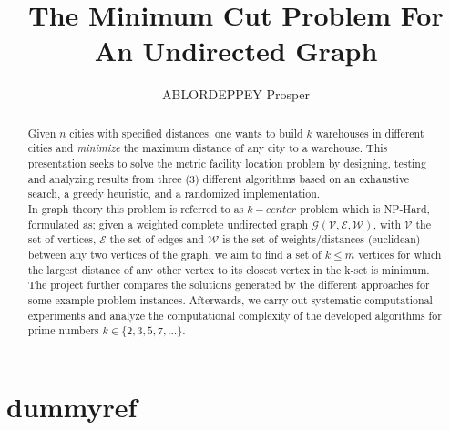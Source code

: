 \documentclass[longpaper, english, final, times]{revdetua}
\begin{document}
	
	
	\title{The Minimum Cut Problem For An Undirected Graph}
	\author{ABLORDEPPEY Prosper} %
	\maketitle
	
	\begin{abstract}%
%		
		Given $n$ cities with specified distances, one wants to build $k$ warehouses in different cities and \textit{minimize} the maximum distance of any city to a warehouse. This presentation seeks to solve the metric facility location problem by designing, testing and analyzing results from three (3) different algorithms based on an exhaustive search, a greedy heuristic, and a randomized implementation.\\
		
		In graph theory this problem is referred to as $k-center$ problem which is NP-Hard, formulated as; 
		given a weighted complete undirected graph $\mathcal{G(V, E, W)}$, with $\mathcal{V}$ the set of vertices, $\mathcal{E}$ the set of edges and $\mathcal{W}$ is the set of weights/distances (euclidean) between any two vertices of the graph, we aim to find a set of $k \leq m$ vertices for which the largest distance of any other vertex to its closest vertex in the k-set is minimum.\\
		
		The project further compares the solutions generated by the different approaches for some example problem instances. Afterwards, we carry out systematic computational experiments and analyze the computational complexity of the developed algorithms for prime numbers $k \in \{2,3,5,7,\dots\}$.
	\end{abstract}

	\section{dummyref}
		\cite{adjacencymatrixdefinition}
		\cite{GONZALEZ1985293}
		\cite{black2012greedy}
		\cite{erdos1959random}
		\cite{kcenterProblem}
	
\end{document}
